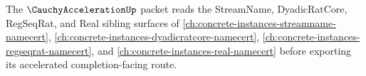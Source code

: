 The $\CauchyAccelerationUp$ packet reads the StreamName, DyadicRatCore, RegSeqRat, and Real sibling surfaces of \autoref{ch:concrete-instances-streamname-namecert}, \autoref{ch:concrete-instances-dyadicratcore-namecert}, \autoref{ch:concrete-instances-regseqrat-namecert}, and \autoref{ch:concrete-instances-real-namecert} before exporting its accelerated completion-facing route.






